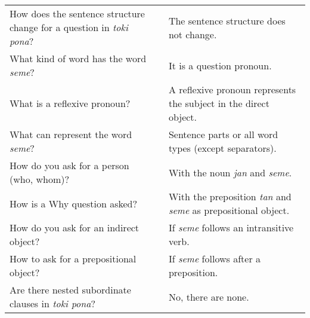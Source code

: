 \begin{supertabular}{p{5,5cm}|ll}
    How does the sentence structure change for a question in \textit{toki pona}? &  & The sentence structure does not change.                                      \\ %
    What kind of word has the word \textit{seme}?                                &  & It is a question pronoun.                                                    \\ %
    What is a reflexive pronoun?                                                 &  & A reflexive pronoun represents the subject in the direct object.             \\ %
    What can represent the word \textit{seme}?                                   &  & Sentence parts or all word types (except separators).                        \\ %
    How do you ask for a person (who, whom)?                                     &  & With the noun \textit{jan} and \textit{seme}.                                \\ %
    How is a Why question asked?                                                 &  & With the preposition \textit{tan} and \textit{seme} as prepositional object. \\ %
    How do you ask for an indirect object?                                       &  & If \textit{seme} follows an intransitive verb.                               \\ %
    How to ask for a prepositional object?                                       &  & If \textit{seme} follows after a preposition.                                \\ %
    Are there nested subordinate clauses in \textit{toki pona}?                  &  & No, there are none.                                                          \\ %
\end{supertabular}

